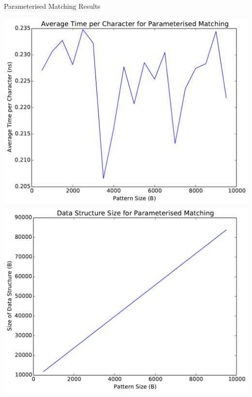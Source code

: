 \documentclass[ %
                    author={Dominic Moylett},
                supervisor={Dr. Raphael Clifford, Dr. Markus Jalsenius and Dr. Ben Sach},
                     title={An Empirical Analysis of Data Streaming Algorithms},
                  subtitle={},
                    degree={MEng},
                      year={2014} ]{poster}
\begin{document}
\begin{frame}{}
\begin{columns}[t]
  \begin{column}{0.422\linewidth}
  \begin{block}{\Large Parameterised Matching Results}
  \begin{center}
  \includegraphics[scale=0.6]{parameterised_run_time}\includegraphics[scale=0.6]{parameterised_size}
  \end{center}
  \end{block}
  \end{column}


\end{columns}
\end{frame}
\end{document}

